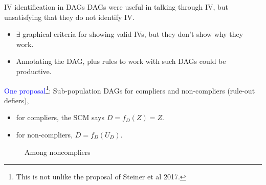\documentclass[xcolor=dvipsnames]{beamer}
\begin{document}
\begin{frame}{IV identification in DAGs}
\small
{} DAGs were useful in talking through IV, but unsatisfying that they do not identify IV.  
\footnotesize
\begin{itemize}
\item<2-> $\exists$ graphical criteria for showing valid IVs, but they don't show why they work.
\item<3-> Annotating the DAG, plus rules to work with such DAGs could be productive.
\end{itemize}
\small
{} \textcolor{Blue}{One proposal}\footnote{\footnotesize This is not unlike the proposal of Steiner et al 2017.}:  Sub-population DAGs for compliers and non-compliers (rule-out defiers), 
\begin{itemize}
\item for compliers, the SCM says $D=f_D(Z)=Z$. 
\item for non-compliers, $D=f_D(U_D)$.
\end{itemize}

\begin{figure}
 \begin{columns}
    \begin{center}
\caption{Among compliers}
\end{center}
\begin{center}
\caption{Among noncompliers}
\end{center}
\end{columns}
\end{figure}
\end{frame}
\end{document}
